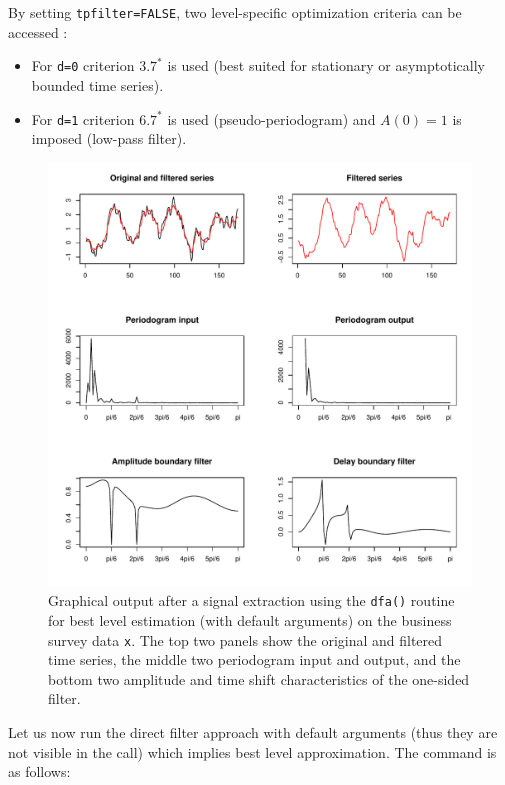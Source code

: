 \documentclass[a4paper]{article}
\begin{document}
\noindent By setting \texttt{tpfilter=FALSE}, two level-specific
optimization criteria can be accessed :
\begin{itemize}
\item For \texttt{d=0} criterion $3.7^*$ is used (best suited for
  stationary or asymptotically bounded time series). 
\item For \texttt{d=1} criterion $6.7^*$ is used (pseudo-periodogram)
  and $A(0)=1$ is imposed (low-pass filter). 
\end{itemize}
\begin{figure}[htb!] 
\begin{center}
\includegraphics[width=\textwidth]{levelfilter_la5_exp2k5_pbd1k02_pb_14_sb7_limamp5_nloops10_d0}
\caption{Graphical output after a signal extraction using the
  \texttt{dfa()} routine for best level estimation (with default
  arguments) on the business survey data \texttt{x}. The top two
  panels show the original and filtered time series, the middle two
  periodogram input and output, and the bottom two amplitude and time
  shift characteristics of the one-sided filter.\label{fig1}}
\end{center}
\end{figure}
Let us now run the direct filter approach with default arguments (thus
they are not visible in the call) which implies best level
approximation. The command is as follows:
\end{document}
